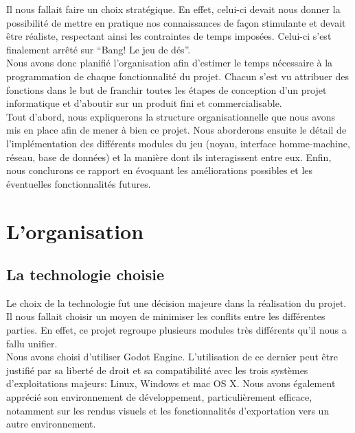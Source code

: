 \documentclass[a4paper,11pt]{article}
\begin{document}
    Il nous fallait faire un choix stratégique. En effet, celui-ci devait nous donner la possibilité de mettre en pratique nos connaissances de façon stimulante et devait être réaliste, respectant ainsi les contraintes de temps imposées. Celui-ci s’est finalement arrêté sur “Bang! Le jeu de dés”. \\

    Nous avons donc planifié l’organisation afin d’estimer le temps nécessaire à la programmation de chaque fonctionnalité du projet. Chacun s’est vu attribuer des fonctions dans le but de franchir toutes les étapes de conception d’un projet informatique et d’aboutir sur un produit fini et commercialisable. \\

     Tout d’abord, nous expliquerons la structure organisationnelle que nous avons mis en place afin de mener à bien ce projet. Nous aborderons ensuite le détail de l’implémentation des différents modules du jeu (noyau, interface homme-machine, réseau, base de données) et la manière dont ils interagissent entre eux. Enfin, nous conclurons ce rapport en évoquant les améliorations possibles et les éventuelles fonctionnalités futures. \\

\newpage

\section{L'organisation}

\subsection{La technologie choisie}

    Le choix de la technologie fut une décision majeure dans la réalisation du projet. Il nous fallait choisir un moyen de minimiser les conflits entre les différentes parties. En effet, ce projet regroupe plusieurs modules très différents qu’il nous a fallu unifier. \\

    Nous avons choisi d’utiliser Godot Engine. L’utilisation de ce dernier peut être justifié par sa liberté de droit et sa compatibilité avec les trois systèmes d’exploitations majeurs: Linux, Windows et mac OS X. Nous avons également apprécié son environnement de développement, particulièrement efficace, notamment sur les rendus visuels et les fonctionnalités d’exportation vers un autre environnement. \\
\end{document}
